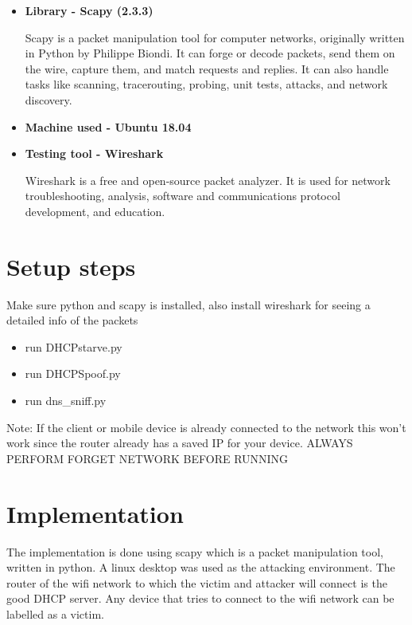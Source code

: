 \documentclass[12pt]{article}
\begin{document}
\begin{sloppypar}
\begin{itemize}
	
	\item \textbf{Library - Scapy (2.3.3)}
	
	Scapy is a packet manipulation tool for computer networks, originally written in Python by Philippe Biondi. It can forge or decode packets, send them on the wire, capture them, and match requests and replies. It can also handle tasks like scanning, tracerouting, probing, unit tests, attacks, and network discovery.	
	
	\item \textbf{Machine used - Ubuntu 18.04}
	
	\item \textbf{Testing tool - Wireshark}
	
	Wireshark is a free and open-source packet analyzer. It is used for network troubleshooting, analysis, software and communications protocol development, and education. 
	
	
\end{itemize}

\section{Setup steps}

Make sure python and scapy is installed, also install wireshark for seeing a detailed info of the packets

\begin{itemize}
	\item run DHCPstarve.py
	\item run DHCPSpoof.py
	\item run dns\_sniff.py
\end{itemize}

Note: If the client or mobile device is already connected to the network this won't work since the router already has a saved IP for your device. ALWAYS PERFORM FORGET NETWORK BEFORE RUNNING




\newpage
\section{Implementation}
\begin{sloppypar}
The implementation is done using scapy which is a packet manipulation tool, written in python. A linux desktop was used as the attacking environment. The router of the wifi network to which the victim and attacker will connect is the good DHCP server. Any device that tries to connect to the wifi network can be labelled as a victim.



\end{sloppypar}
\end{sloppypar}
\end{document}
